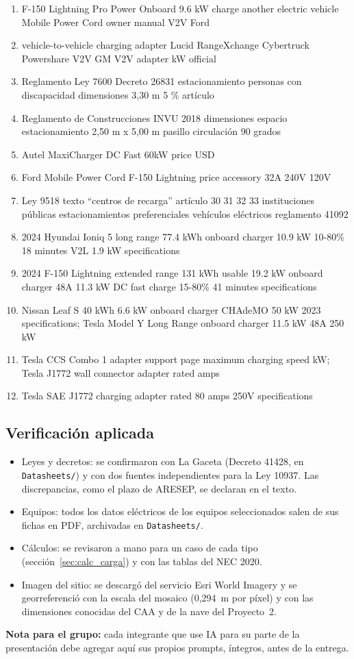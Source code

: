 {\begin{enumerate}
\item F-150 Lightning Pro Power Onboard 9.6 kW charge another electric vehicle Mobile Power Cord owner manual V2V Ford
\item vehicle-to-vehicle charging adapter Lucid RangeXchange Cybertruck Powershare V2V GM V2V adapter kW official
\item Reglamento Ley 7600 Decreto 26831 estacionamiento personas con discapacidad dimensiones 3,30 m 5 \% artículo
\item Reglamento de Construcciones INVU 2018 dimensiones espacio estacionamiento 2,50 m x 5,00 m pasillo circulación 90 grados
\item Autel MaxiCharger DC Fast 60kW price USD
\item Ford Mobile Power Cord F-150 Lightning price accessory 32A 240V 120V
\item Ley 9518 texto ``centros de recarga'' artículo 30 31 32 33 instituciones públicas estacionamientos preferenciales vehículos eléctricos reglamento 41092
\item 2024 Hyundai Ioniq 5 long range 77.4 kWh onboard charger 10.9 kW 10-80\% 18 minutes V2L 1.9 kW specifications
\item 2024 F-150 Lightning extended range 131 kWh usable 19.2 kW onboard charger 48A 11.3 kW DC fast charge 15-80\% 41 minutes specifications
\item Nissan Leaf S 40 kWh 6.6 kW onboard charger CHAdeMO 50 kW 2023 specifications; Tesla Model Y Long Range onboard charger 11.5 kW 48A 250 kW
\item Tesla CCS Combo 1 adapter support page maximum charging speed kW; Tesla J1772 wall connector adapter rated amps
\item Tesla SAE J1772 charging adapter rated 80 amps 250V specifications
\end{enumerate}}

\subsection*{Verificación aplicada}
\begin{itemize}
\item Leyes y decretos: se confirmaron con La Gaceta (Decreto 41428, en \texttt{Datasheets/}) y con dos fuentes independientes para la Ley 10937. Las discrepancias, como el plazo de ARESEP, se declaran en el texto.
\item Equipos: todos los datos eléctricos de los equipos seleccionados salen de sus fichas en PDF, archivadas en \texttt{Datasheets/}.
\item Cálculos: se revisaron a mano para un caso de cada tipo (sección~\ref{sec:calc_carga}) y con las tablas del NEC 2020.
\item Imagen del sitio: se descargó del servicio Esri World Imagery y se georreferenció con la escala del mosaico (0,294~m por píxel) y con las dimensiones conocidas del CAA y de la nave del Proyecto~2.
\end{itemize}

\textbf{Nota para el grupo:} cada integrante que use IA para su parte de la presentación debe agregar aquí sus propios prompts, íntegros, antes de la entrega.
